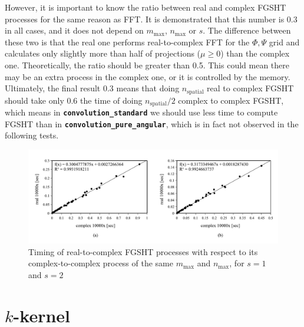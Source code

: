 However, it is important to know the ratio between real and complex
\acs{FGSHT} processes for the same reason as \acs{FFT}. It is demonstrated
that this number is 0.3 in all cases, and it does not depend on $m_{\max}$,
$n_{\max}$ or $s$. The difference between these two is that the
real one performs real-to-complex \acs{FFT} for the $\Phi,\Psi$
grid and calculates only slightly more than half of projections ($\mu\geq0$)
than the complex one.\textcolor{red}{{} }Theoretically, the ratio should
be greater than 0.5. This could mean there may be an extra process
in the complex one, or it is controlled by the memory. Ultimately,
the final result 0.3 means that doing $n_{\mathrm{spatial}}$ real
to complex \acs{FGSHT} should take only 0.6 the time of doing $n_{\mathrm{spatial}}/2$
complex to complex \acs{FGSHT}, which means in \texttt{\textbf{convolution\_standard}}
we should use less time to compute \acs{FGSHT} than in \texttt{\textbf{convolution\_pure\_angular}},
which is in fact not observed in the following tests.
\begin{center}
\begin{figure}[H]
\begin{centering}
\includegraphics[bb=20bp 20bp 660bp 235bp,width=1\columnwidth]{_figure/results/fgsht_real_v_cmplx}
\par\end{centering}
\caption[Timing of real-to-complex \acs{FGSHT} processes with respect to its
complex-to-complex process of the same $m_{\max}$ and $n_{\max}$]{Timing of real-to-complex \acs{FGSHT} processes with respect to
its complex-to-complex process of the same $m_{\max}$ and $n_{\max}$,
for $s=1$ and $s=2$\label{fig:fgsht-real-to-complex}}
\end{figure}
\par\end{center}

\section{$k$-kernel\label{sec:-kernel}}

